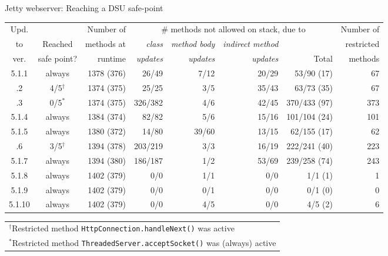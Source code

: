 \begin{frame}[shrink=5]{Jetty webserver: Reaching a DSU safe-point}%
\begin{tiny}
\begin{center}
\begin{tabular}{|c|c|r|rrrr|r|} \hline
Upd.    &                   & Number of  & \multicolumn{4}{c|}{\# methods not allowed on stack, due to}                 & Number of \\
to      & Reached           & methods at & \emph{class}   & \emph{method body} & \emph{indirect method}  &              & restricted \\
ver.    & safe point?       & runtime    & \emph{updates} & \emph{updates}     & \emph{updates}          & Total        & methods   \\ \hline \hline
5.1.1   &  always           & 1378 (376) & 26/49          & 7/12               & 20/29                   & 53/90  (17)  & 67        \\ \HighlightRow
5.1.2   &  4/5$^\dagger$    & 1374 (375) & 25/25          & 3/5                & 35/43                   & 63/73  (35)  & 67        \\ \HighlightRow
5.1.3   &  0/5$^*$          & 1374 (375) & 326/382        & 4/6                & 42/45                   & 370/433 (97) & 373       \\
5.1.4   &  always           & 1384 (374) & 82/82          & 5/6                & 15/16                   & 101/104 (24) & 101       \\
5.1.5   &  always           & 1380 (372) & 14/80          & 39/60              & 13/15                   & 62/155 (17)  & 62        \\ \HighlightRow
5.1.6   &  3/5$^\dagger$    & 1394 (378) & 203/219        & 3/3                & 16/19                   & 222/241 (40) & 223       \\
5.1.7   &  always           & 1394 (380) & 186/187        & 1/2                & 53/69                   & 239/258 (74) & 243       \\
5.1.8   &  always           & 1402 (379) & 0/0            & 1/1                & 0/0                     & 1/1   (1)    & 1         \\
5.1.9   &  always           & 1402 (379) & 0/0            & 0/1                & 0/0                     & 0/1   (0)    & 0         \\
5.1.10  &  always           & 1402 (379) & 0/0            & 4/5                & 0/0                     & 4/5   (2)    & 6         \\ \hline
\end{tabular}
\end{center}
\begin{tabular}{l}
$^\dagger$Restricted method \texttt{HttpConnection.handleNext()} was
active \\
$^*$Restricted method \texttt{ThreadedServer.acceptSocket()} was
(always) active
\end{tabular}
\end{tiny}


\end{frame}
